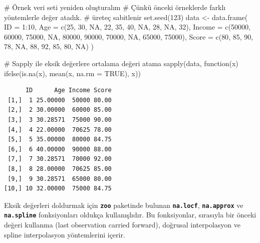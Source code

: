 \documentclass[
  letterpaper,
  DIV=11,
  numbers=noendperiod]{scrreprt}
\newenvironment{Shaded}{\begin{snugshade}}{\end{snugshade}}
\newcommand{\AttributeTok}[1]{\textcolor[rgb]{0.40,0.45,0.13}{#1}}
\newcommand{\CommentTok}[1]{\textcolor[rgb]{0.37,0.37,0.37}{#1}}
\newcommand{\ConstantTok}[1]{\textcolor[rgb]{0.56,0.35,0.01}{#1}}
\newcommand{\ControlFlowTok}[1]{\textcolor[rgb]{0.00,0.23,0.31}{#1}}
\newcommand{\DecValTok}[1]{\textcolor[rgb]{0.68,0.00,0.00}{#1}}
\newcommand{\FunctionTok}[1]{\textcolor[rgb]{0.28,0.35,0.67}{#1}}
\newcommand{\NormalTok}[1]{\textcolor[rgb]{0.00,0.23,0.31}{#1}}
\newcommand{\OtherTok}[1]{\textcolor[rgb]{0.00,0.23,0.31}{#1}}
\newcommand{\SpecialCharTok}[1]{\textcolor[rgb]{0.37,0.37,0.37}{#1}}
\begin{document}
\begin{Shaded}
\begin{Highlighting}[]
\CommentTok{\# Örnek veri seti yeniden oluşturalım}
\CommentTok{\# Çünkü önceki örneklerde farklı yöntemlerle değer atadık.}
\CommentTok{\# üreteç sabitlenir}
\FunctionTok{set.seed}\NormalTok{(}\DecValTok{123}\NormalTok{)}
\NormalTok{data }\OtherTok{\textless{}{-}} \FunctionTok{data.frame}\NormalTok{(}
  \AttributeTok{ID =} \DecValTok{1}\SpecialCharTok{:}\DecValTok{10}\NormalTok{,}
  \AttributeTok{Age =} \FunctionTok{c}\NormalTok{(}\DecValTok{25}\NormalTok{, }\DecValTok{30}\NormalTok{, }\ConstantTok{NA}\NormalTok{, }\DecValTok{22}\NormalTok{, }\DecValTok{35}\NormalTok{, }\DecValTok{40}\NormalTok{, }\ConstantTok{NA}\NormalTok{, }\DecValTok{28}\NormalTok{, }\ConstantTok{NA}\NormalTok{, }\DecValTok{32}\NormalTok{),}
  \AttributeTok{Income =} \FunctionTok{c}\NormalTok{(}\DecValTok{50000}\NormalTok{, }\DecValTok{60000}\NormalTok{, }\DecValTok{75000}\NormalTok{, }\ConstantTok{NA}\NormalTok{, }\DecValTok{80000}\NormalTok{, }\DecValTok{90000}\NormalTok{, }\DecValTok{70000}\NormalTok{, }\ConstantTok{NA}\NormalTok{, }\DecValTok{65000}\NormalTok{, }\DecValTok{75000}\NormalTok{),}
  \AttributeTok{Score =} \FunctionTok{c}\NormalTok{(}\DecValTok{80}\NormalTok{, }\DecValTok{85}\NormalTok{, }\DecValTok{90}\NormalTok{, }\DecValTok{78}\NormalTok{, }\ConstantTok{NA}\NormalTok{, }\DecValTok{88}\NormalTok{, }\DecValTok{92}\NormalTok{, }\DecValTok{85}\NormalTok{, }\DecValTok{80}\NormalTok{, }\ConstantTok{NA}\NormalTok{)}
\NormalTok{)}


\CommentTok{\# Sapply ile eksik değerlere ortalama değeri atama}
\FunctionTok{sapply}\NormalTok{(data, }\ControlFlowTok{function}\NormalTok{(x)}
  \FunctionTok{ifelse}\NormalTok{(}\FunctionTok{is.na}\NormalTok{(x), }\FunctionTok{mean}\NormalTok{(x, }\AttributeTok{na.rm =} \ConstantTok{TRUE}\NormalTok{), x))}
\end{Highlighting}
\end{Shaded}

\begin{verbatim}
      ID      Age Income Score
 [1,]  1 25.00000  50000 80.00
 [2,]  2 30.00000  60000 85.00
 [3,]  3 30.28571  75000 90.00
 [4,]  4 22.00000  70625 78.00
 [5,]  5 35.00000  80000 84.75
 [6,]  6 40.00000  90000 88.00
 [7,]  7 30.28571  70000 92.00
 [8,]  8 28.00000  70625 85.00
 [9,]  9 30.28571  65000 80.00
[10,] 10 32.00000  75000 84.75
\end{verbatim}

Eksik değerleri doldurmak için \textbf{\texttt{zoo}} paketinde bulunan
\textbf{\texttt{na.locf}}, \textbf{\texttt{na.approx}} ve
\textbf{\texttt{na.spline}} fonksiyonları oldukça kullanışlıdır. Bu
fonksiyonlar, sırasıyla bir önceki değeri kullanma (last observation
carried forward), doğrusal interpolasyon ve spline interpolasyon
yöntemlerini içerir.
\end{document}
